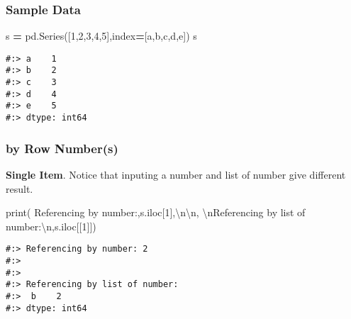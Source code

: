 \documentclass[
]{book}
\newenvironment{Shaded}{\begin{snugshade}}{\end{snugshade}}
\newcommand{\BuiltInTok}[1]{#1}
\newcommand{\CharTok}[1]{\textcolor[rgb]{0.5,0.5,0.5}{#1}}
\newcommand{\DecValTok}[1]{\textcolor[rgb]{0.06,0.06,0.06}{#1}}
\newcommand{\NormalTok}[1]{#1}
\newcommand{\OperatorTok}[1]{\textcolor[rgb]{0.43,0.43,0.43}{\textbf{#1}}}
\newcommand{\StringTok}[1]{\textcolor[rgb]{0.5,0.5,0.5}{#1}}
\begin{document}
\hypertarget{sample-data-4}{%
\subsubsection{Sample Data}\label{sample-data-4}}

\begin{Shaded}
\begin{Highlighting}[]
\NormalTok{s }\OperatorTok{=}\NormalTok{ pd.Series([}\DecValTok{1}\NormalTok{,}\DecValTok{2}\NormalTok{,}\DecValTok{3}\NormalTok{,}\DecValTok{4}\NormalTok{,}\DecValTok{5}\NormalTok{],index}\OperatorTok{=}\NormalTok{[}\StringTok{\textquotesingle{}a\textquotesingle{}}\NormalTok{,}\StringTok{\textquotesingle{}b\textquotesingle{}}\NormalTok{,}\StringTok{\textquotesingle{}c\textquotesingle{}}\NormalTok{,}\StringTok{\textquotesingle{}d\textquotesingle{}}\NormalTok{,}\StringTok{\textquotesingle{}e\textquotesingle{}}\NormalTok{]) }
\NormalTok{s}
\end{Highlighting}
\end{Shaded}

\begin{verbatim}
#:> a    1
#:> b    2
#:> c    3
#:> d    4
#:> e    5
#:> dtype: int64
\end{verbatim}

\hypertarget{by-row-numbers}{%
\subsubsection{by Row Number(s)}\label{by-row-numbers}}

\textbf{Single Item}. Notice that inputing a number and list of number give different result.

\begin{Shaded}
\begin{Highlighting}[]
\BuiltInTok{print}\NormalTok{( }\StringTok{\textquotesingle{}Referencing by number:\textquotesingle{}}\NormalTok{,s.iloc[}\DecValTok{1}\NormalTok{],}\StringTok{\textquotesingle{}}\CharTok{\textbackslash{}n\textbackslash{}n}\StringTok{\textquotesingle{}}\NormalTok{,}
       \StringTok{\textquotesingle{}}\CharTok{\textbackslash{}n}\StringTok{Referencing by list of number:}\CharTok{\textbackslash{}n}\StringTok{\textquotesingle{}}\NormalTok{,s.iloc[[}\DecValTok{1}\NormalTok{]])}
\end{Highlighting}
\end{Shaded}

\begin{verbatim}
#:> Referencing by number: 2 
#:> 
#:>  
#:> Referencing by list of number:
#:>  b    2
#:> dtype: int64
\end{verbatim}
\end{document}
